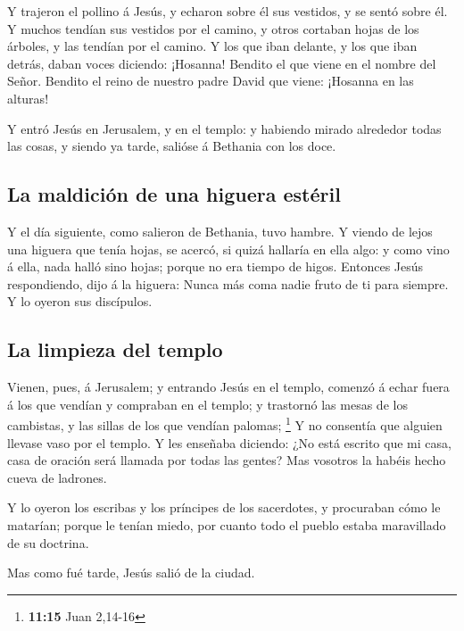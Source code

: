  Y trajeron el pollino á Jesús, y echaron sobre él sus
vestidos, y se sentó sobre él.  Y muchos tendían sus
vestidos por el camino, y otros cortaban hojas de los árboles, y las
tendían por el camino.  Y los que iban delante, y los que
iban detrás, daban voces diciendo: ¡Hosanna! Bendito el que viene en el
nombre del Señor.  Bendito el reino de nuestro padre
David que viene: ¡Hosanna en las alturas!

 Y entró Jesús en Jerusalem, y en el templo: y habiendo
mirado alrededor todas las cosas, y siendo ya tarde, salióse á Bethania
con los doce.

\hypertarget{la-maldiciuxf3n-de-una-higuera-estuxe9ril}{%
\subsection{La maldición de una higuera
estéril}\label{la-maldiciuxf3n-de-una-higuera-estuxe9ril}}

 Y el día siguiente, como salieron de Bethania, tuvo
hambre.  Y viendo de lejos una higuera que tenía hojas,
se acercó, si quizá hallaría en ella algo: y como vino á ella, nada
halló sino hojas; porque no era tiempo de higos. 
Entonces Jesús respondiendo, dijo á la higuera: Nunca más coma nadie
fruto de ti para siempre. Y lo oyeron sus discípulos.

\hypertarget{la-limpieza-del-templo}{%
\subsection{La limpieza del templo}\label{la-limpieza-del-templo}}

 Vienen, pues, á Jerusalem; y entrando Jesús en el
templo, comenzó á echar fuera á los que vendían y compraban en el
templo; y trastornó las mesas de los cambistas, y las sillas de los que
vendían palomas; \footnote{\textbf{11:15} Juan 2,14-16} 
Y no consentía que alguien llevase vaso por el templo.  Y
les enseñaba diciendo: ¿No está escrito que mi casa, casa de oración
será llamada por todas las gentes? Mas vosotros la habéis hecho cueva de
ladrones.

 Y lo oyeron los escribas y los príncipes de los
sacerdotes, y procuraban cómo le matarían; porque le tenían miedo, por
cuanto todo el pueblo estaba maravillado de su doctrina.

 Mas como fué tarde, Jesús salió de la ciudad.

